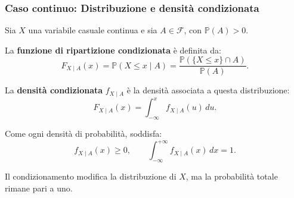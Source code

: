 \documentclass[handout]{beamer}%
\providecommand{\Prob}{\mathbb{P}}
\providecommand{\F}{\mathcal{F}}
\providecommand{\1}{\mathbf{1}}
\providecommand{\QTR}[2]{\csname #1\endcsname{#2}}
\begin{document}
\begin{frame}%
%

\frametitle{Caso continuo: Distribuzione e densit\`{a} condizionata}%
%

%


Sia $X$ una variabile casuale continua e sia $A\in\F$, con $\Prob(A)>0$.

\medskip

La \textbf{funzione di ripartizione condizionata} \`{e} definita da:
\[
F_{X\mid A}(x) = \Prob(X\leq x\mid A) = \frac{\Prob(\{X\leq x\}\cap
A)}{\Prob(A)}.
\]


\medskip

La \textbf{densit\`{a} condizionata} $f_{X\mid A}$ \`{e} la densit\`{a}
associata a questa distribuzione:
\[
F_{X\mid A}(x) = \int_{-\infty}^{x} f_{X\mid A}(u)\,du.
\]


\medskip

Come ogni densit\`{a} di probabilit\`{a}, soddisfa:
\[
\boxed{
f_{X\mid A}(x)\geq 0,
\qquad
\int_{-\infty}^{+\infty}
f_{X\mid A}(x)\,dx=1.
}
\]


\medskip

\begin{center}
{\small Il condizionamento modifica la distribuzione di $X$, ma la
probabilit\`{a} totale rimane pari a uno. }
\end{center}%

\transboxout
\end{frame}%
\end{document}
